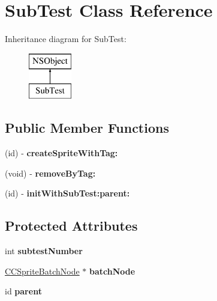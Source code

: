 \hypertarget{interface_sub_test}{\section{Sub\-Test Class Reference}
\label{interface_sub_test}
}
Inheritance diagram for Sub\-Test\-:\begin{figure}[H]
\begin{center}
\leavevmode
\includegraphics[height=2.000000cm]{interface_sub_test}
\end{center}
\end{figure}
\subsection*{Public Member Functions}
\begin{DoxyCompactItemize}
\item 
\hypertarget{interface_sub_test_a54cbb224f1ba7768b40f3f5e10a35dd0}{(id) -\/ {\bfseries create\-Sprite\-With\-Tag\-:}}\label{interface_sub_test_a54cbb224f1ba7768b40f3f5e10a35dd0}

\item 
\hypertarget{interface_sub_test_aff0f3bdc448a239fe780747bc7fec36c}{(void) -\/ {\bfseries remove\-By\-Tag\-:}}\label{interface_sub_test_aff0f3bdc448a239fe780747bc7fec36c}

\item 
\hypertarget{interface_sub_test_a2bfef8ef5e58966824145690354717f5}{(id) -\/ {\bfseries init\-With\-Sub\-Test\-:parent\-:}}\label{interface_sub_test_a2bfef8ef5e58966824145690354717f5}

\end{DoxyCompactItemize}
\subsection*{Protected Attributes}
\begin{DoxyCompactItemize}
\item 
\hypertarget{interface_sub_test_ab03fd3054644c5c84f04cb2e52b0ec02}{int {\bfseries subtest\-Number}}\label{interface_sub_test_ab03fd3054644c5c84f04cb2e52b0ec02}

\item 
\hypertarget{interface_sub_test_ae1b343b10c71578bdd3c0d2ae8f30d3f}{\hyperlink{interface_c_c_sprite_batch_node}{C\-C\-Sprite\-Batch\-Node} $\ast$ {\bfseries batch\-Node}}\label{interface_sub_test_ae1b343b10c71578bdd3c0d2ae8f30d3f}

\item 
\hypertarget{interface_sub_test_a8b7acdd5697ae3dda0905fa6555f273b}{id {\bfseries parent}}\label{interface_sub_test_a8b7acdd5697ae3dda0905fa6555f273b}

\end{DoxyCompactItemize}


